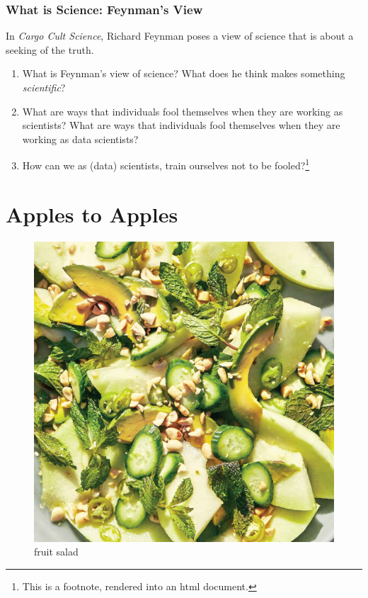 \documentclass[
]{book}
\providecommand{\tightlist}{%
  \setlength{\itemsep}{0pt}\setlength{\parskip}{0pt}}
\begin{document}
\hypertarget{what-is-science-feynmans-view}{%
\subsection{What is Science: Feynman's
View}\label{what-is-science-feynmans-view}}

In \emph{Cargo Cult Science}, Richard Feynman poses a view of science
that is about a seeking of the truth.

\begin{enumerate}
\def\labelenumi{\arabic{enumi}.}
\tightlist
\item
  What is Feynman's view of science? What does he think makes something
  \emph{scientific}?
\item
  What are ways that individuals fool themselves when they are working
  as scientists? What are ways that individuals fool themselves when
  they are working as data scientists?
\item
  How can we as (data) scientists, train ourselves not to be
  fooled?\footnote{This is a footnote, rendered into an html document.}
\end{enumerate}

\hypertarget{apples-to-apples}{%
\chapter{Apples to Apples}\label{apples-to-apples}}

\begin{figure}
\centering
\includegraphics{./images/honeydew-salad-with-ginger-dressing-and-peanuts.jpeg}
\caption{fruit salad}
\end{figure}
\end{document}
